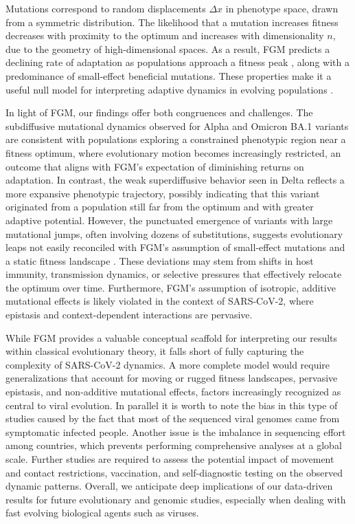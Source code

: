 Mutations correspond to random displacements $\Delta x$ in phenotype space, drawn from a symmetric distribution. The likelihood that a mutation increases fitness decreases with proximity to the optimum and increases with dimensionality $n$, due to the geometry of high-dimensional spaces. As a result, FGM predicts a declining rate of adaptation as populations approach a fitness peak \cite{couce2015}, along with a predominance of small-effect beneficial mutations. These properties make it a useful null model for interpreting adaptive dynamics in evolving populations \cite{tenaillon2014}.

In light of FGM, our findings offer both congruences and challenges. The subdiffusive mutational dynamics observed for Alpha and Omicron BA.1 variants are consistent with populations exploring a constrained phenotypic region near a fitness optimum, where evolutionary motion becomes increasingly restricted, an outcome that aligns with FGM's expectation of diminishing returns on adaptation. In contrast, the weak superdiffusive behavior seen in Delta reflects a more expansive phenotypic trajectory, possibly indicating that this variant originated from a population still far from the optimum and with greater adaptive potential. However, the punctuated emergence of variants with large mutational jumps, often involving dozens of substitutions, suggests evolutionary leaps not easily reconciled with FGM's assumption of small-effect mutations and a static fitness landscape \cite{miller2011}. These deviations may stem from shifts in host immunity, transmission dynamics, or selective pressures that effectively relocate the optimum over time. Furthermore, FGM's assumption of isotropic, additive mutational effects is likely violated in the context of SARS-CoV-2, where epistasis and context-dependent interactions are pervasive.

While FGM provides a valuable conceptual scaffold for interpreting our results within classical evolutionary theory, it falls short of fully capturing the complexity of SARS-CoV-2 dynamics. A more complete model would require generalizations that account for moving or rugged fitness landscapes, pervasive epistasis, and non-additive mutational effects, factors increasingly recognized as central to viral evolution. In parallel it is worth to note the bias in this type of studies caused by the fact that most of the sequenced viral genomes came from symptomatic infected people. Another issue is the imbalance in sequencing effort among countries, which prevents performing comprehensive analyses at a global scale. Further studies are required to assess the potential impact of movement and contact restrictions, vaccination, and self-diagnostic testing on the observed dynamic patterns. Overall, we anticipate deep implications of our data-driven results for future evolutionary and genomic studies, especially when dealing with fast evolving biological agents such as viruses.


